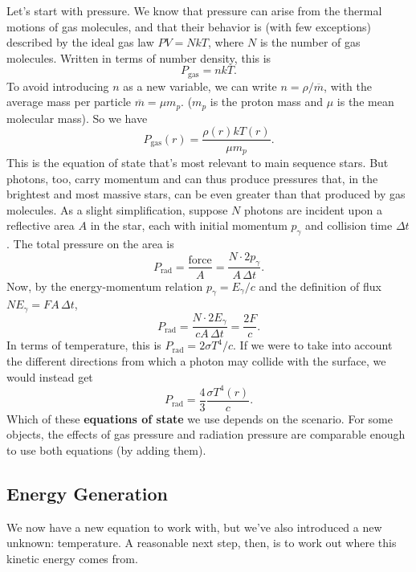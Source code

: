 \documentclass[../a062main.tex]{subfiles}
\begin{document}
Let's start with pressure.
We know that pressure can arise from the thermal motions of gas molecules, and that their behavior is (with few exceptions) described by the ideal gas law $PV = NkT$, where $N$ is the number of gas molecules.
Written in terms of number density, this is
\[ P_\textrm{gas} = nkT. \]
To avoid introducing $n$ as a new variable, we can write $n = \rho / \overline m$, with the average mass per particle $\overline m = \mu m_p$.
($m_p$ is the proton mass and $\mu$ is the mean molecular mass).
So we have
\[ \boxed{P_\textrm{gas}(r) = \frac{\rho(r) kT(r)}{\mu m_p}}. \]
This is the equation of state that's most relevant to main sequence stars.
But photons, too, carry momentum and can thus produce pressures that, in the brightest and most massive stars, can be even greater than that produced by gas molecules.
As a slight simplification, suppose $N$ photons are incident upon a reflective area $A$ in the star, each with initial momentum $p_\gamma$ and collision time $\Delta t$.
The total pressure on the area is
\[ P_\textrm{rad} = \frac{\textrm{force}}{A} = \frac{N \cdot 2p_\gamma}{A \,\Delta t}. \]
Now, by the energy-momentum relation $p_\gamma = E_\gamma / c$ and the definition of flux $N E_\gamma = F A \,\Delta t$,
\[ P_\textrm{rad} = \frac{N \cdot 2E_\gamma}{c A \,\Delta t} = \frac{2F}{c}. \]
In terms of temperature, this is $P_\textrm{rad} = 2 \sigma T^{4} / c$.
If we were to take into account the different directions from which a photon may collide with the surface, we would instead get
\[ \boxed{P_\textrm{rad} = \frac{4}{3} \frac{\sigma T^{4}(r)}{c}}. \]
Which of these \textbf{equations of state} we use depends on the scenario.
For some objects, the effects of gas pressure and radiation pressure are comparable enough to use both equations (by adding them).

\subsection*{Energy Generation}
We now have a new equation to work with, but we've also introduced a new unknown: temperature.
A reasonable next step, then, is to work out where this kinetic energy comes from.
\end{document}
